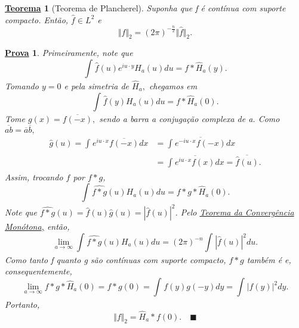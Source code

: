 \documentclass{article}
\newtheorem*{theorem*}{\underline{Teorema}}
\newtheorem*{proof*}{\underline{Prova}}
\renewcommand\qedsymbol{$\blacksquare$}
\begin{document}
 \hypertarget{plancherel}{
   \begin{theorem*}[Teorema de Plancherel]
    Suponha que f é contínua com suporte compacto. Então, \(\hat{f}\in L^{2}\) e 
      \[
        \Vert f \Vert_{2} = (2\pi )^{-\frac{n}{2}}\Vert \hat{f} \Vert_{2}.
      \]
  \end{theorem*}
 }
 \begin{proof*}
   Primeiramente, note que 
     \[
       \int_{}^{}\hat{f}(u)e^{iu \cdot y}H_{a}(u)du = f*\hat{H}_{a}(y).
     \]
  Tomando \(y=0\) e pela simetria de \(\hat{H}_{a},\) chegamos em 
    \[
      \int_{}^{}\hat{f}(y)H_{a}(u)du = f* \hat{H}_{a}(0).
    \]
  Tome \(g(x) = \overline{f(-x)},\) sendo a barra a conjugação complexa de a. Como \(\overline{ab} = \overline{a}\overline{b},\)
 \begin{align*}
   \hat{g}(u) = \int_{}^{}e^{iu \cdot x}\overline{f(-x)}dx &= \overline{\int_{}^{}e^{-i u \cdot x}f(-x)dx}\\
                                                           &= \overline{\int_{}^{}e^{iu \cdot x}f(x)dx} = \overline{\hat{f}(u)}.
 \end{align*}
 Assim, trocando \(f\) por \(f*g\), 
   \[
     \int_{}^{}\widehat{f*g}(u)H_{a}(u)du = f*g*\hat{H}_{a}(0).
   \]
   Note que \(\widehat{f*g}(u) = \hat{f}(u)\hat{g}(u) = |\hat{f}(u)|^{2}\). Pelo \hyperlink{monotone_convergence}{\textit{Teorema da Convergência Monótona},} então, 
     \[
       \lim_{a\to \infty}\int_{}^{}\widehat{f*g}(u)H_{a}(u)du = (2\pi )^{-n}\int_{}^{}|\hat{f}(u)|^{2}du.
     \]
  Como tanto f quanto g são contínuas com suporte compacto, \(f*g\) também é e, consequentemente, 
    \[
      \lim_{a\to \infty}f*g*\hat{H}_{a}(0) = f*g(0) = \int_{}^{}f(y)g(-y)dy = \int_{}^{}|f(y)|^{2}dy.
    \]
  Portanto, 
    \[
      \Vert f \Vert_{2} = \hat{H}_{a}*f(0).\quad \text{\qedsymbol} 
    \]
 \end{proof*}
\end{document}
